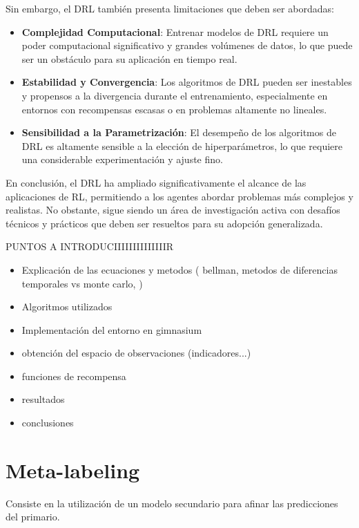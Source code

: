 \documentclass[a4paper,12pt]{report}
\begin{document}
Sin embargo, el DRL también presenta limitaciones que deben ser abordadas:

\begin{itemize}
    \item \textbf{Complejidad Computacional}: Entrenar modelos de DRL requiere un poder computacional significativo y grandes volúmenes de datos, lo que puede ser un obstáculo para su aplicación en tiempo real.
    \item \textbf{Estabilidad y Convergencia}: Los algoritmos de DRL pueden ser inestables y propensos a la divergencia durante el entrenamiento, especialmente en entornos con recompensas escasas o en problemas altamente no lineales.
    \item \textbf{Sensibilidad a la Parametrización}: El desempeño de los algoritmos de DRL es altamente sensible a la elección de hiperparámetros, lo que requiere una considerable experimentación y ajuste fino.
\end{itemize}

En conclusión, el DRL ha ampliado significativamente el alcance de las aplicaciones de RL, permitiendo a los agentes abordar problemas más complejos y realistas. No obstante, sigue siendo un área de investigación activa con desafíos técnicos y prácticos que deben ser resueltos para su adopción generalizada.


PUNTOS A INTRODUCIIIIIIIIIIIIIIR
\begin{itemize}
   \item Explicación de las ecuaciones y metodos ( bellman, metodos de diferencias temporales vs monte carlo, )
   \item Algoritmos utilizados
   \item Implementación del entorno en gimnasium
   \item obtención del espacio de observaciones (indicadores...)
   \item funciones de recompensa
   \item resultados
   \item conclusiones
\end{itemize}

\chapter{Meta-labeling}

Consiste en la utilización de un modelo secundario para afinar las predicciones del primario.
\end{document}
